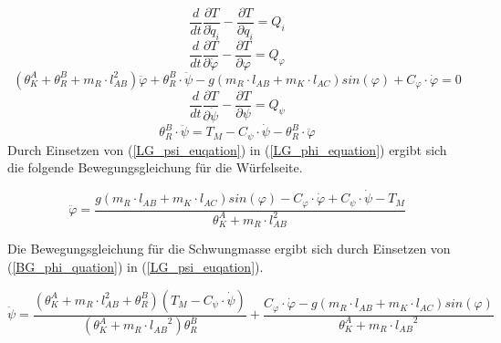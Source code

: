 \begin{equation}
\frac{d}{dt}\frac{\partial T}{\partial \dot{q}_i}-\frac{\partial T}{\partial q_i} = Q_i
\end{equation}
\begin{equation}
\frac{d}{dt}\frac{\partial T}{\partial \dot{\varphi}}-\frac{\partial T}{\partial \varphi} = Q_{\varphi} 
\end{equation}
\begin{equation}
\label{LG_phi_equation}
({\theta}^A_K + {\theta}^B_R + m_R \cdot l_{AB}^2)\ddot{\varphi} + {\theta}^B_R \cdot \ddot{\psi} - g(m_R \cdot l_{AB} + m_K \cdot l_{AC})sin(\varphi) + C_{\varphi} \cdot \dot{\varphi} = 0
\end{equation}
\begin{equation}
\frac{d}{dt}\frac{\partial T}{\partial \dot{\psi}}-\frac{\partial T}{\partial \psi} = Q_{\psi} 
\end{equation}
\begin{equation}
\label{LG_psi_euqation}
{\theta}^B_R \cdot \ddot{\psi} = T_M - C_{\psi} \cdot \dot{\psi} - {\theta}^B_R \cdot \ddot{\varphi}
\end{equation}
\newpage
Durch Einsetzen von (\ref{LG_psi_euqation}) in (\ref{LG_phi_equation}) ergibt sich die folgende Bewegungsgleichung für die Würfelseite.

\begin{equation}
\label{BG_phi_quation}
\ddot{\varphi} = \frac{g(m_R \cdot l_{AB} + m_K \cdot l_{AC})sin(\varphi) - C_{\varphi} \cdot \dot{\varphi} + C_{\psi} \cdot \dot{\psi} - T_M}{{\theta}^A_K + m_R \cdot l_{AB}^2}
\end{equation}

Die Bewegungsgleichung für die Schwungmasse ergibt sich durch Einsetzen von (\ref{BG_phi_quation}) in (\ref{LG_psi_euqation}).

\begin{equation}
\label{BG_psi_equation}
\ddot{\psi} = \frac{({\theta}^A_K + m_R \cdot l_{AB}^2 + {\theta}^B_R)(T_M - C_{\psi} \cdot \dot{\psi})}{({\theta}^A_K + m_R \cdot {l_{AB}}^2){\theta}^B_R} + \frac{C_{\varphi} \cdot \dot{\varphi} - g(m_R \cdot l_{AB} + m_K \cdot l_{AC})sin(\varphi)}{{\theta}^A_K + m_R \cdot {l_{AB}}^2}
\end{equation}